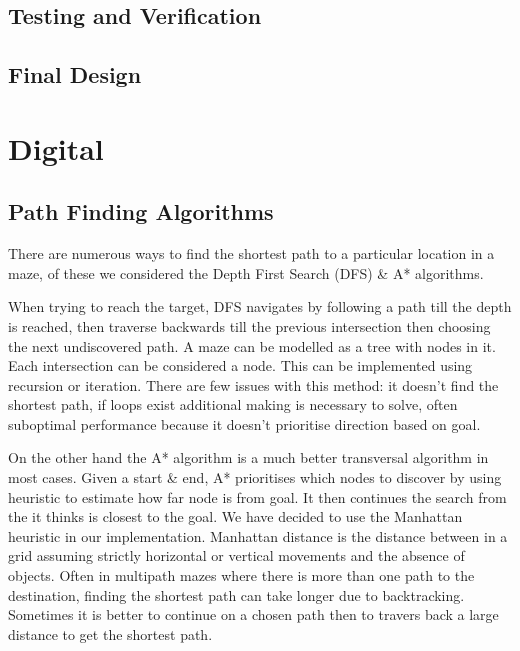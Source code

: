 \documentclass{article}
\begin{document}
\subsection{Testing and Verification}

\subsection{Final Design}


\section{Digital}

\subsection{Path Finding Algorithms}

There are numerous ways to find the shortest path to a particular location in a maze, of these we considered the Depth First Search (DFS) \& A* algorithms.

When trying to reach the target, DFS navigates by following a path till the depth is reached, then traverse backwards till the previous intersection then choosing the next undiscovered path. A maze can be modelled as a tree with nodes in it. Each intersection can be considered a node. This can be implemented using recursion or iteration. There are few issues with this method: it doesn't find the shortest path, if loops exist additional making is necessary to solve, often suboptimal performance because it doesn't prioritise direction based on goal.

On the other hand the A* algorithm is a much better transversal algorithm in most cases. Given a start \& end, A* prioritises which nodes to discover by using heuristic to estimate how far node is from goal. It then continues the search from the it thinks is closest to the goal. We have decided to use the Manhattan heuristic in our implementation. Manhattan distance is the distance between in a grid assuming strictly horizontal or vertical movements and the absence of objects. Often in multipath mazes where there is more than one path to the destination, finding the shortest path can take longer due to backtracking. Sometimes it is better to continue on a chosen path then to travers back a large distance to get the shortest path.
\end{document}
